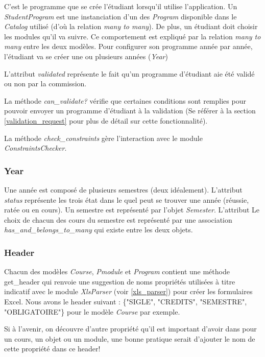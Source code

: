 C'est le programme que se crée l'étudiant lorsqu'il utilise l'application. Un \textit{StudentProgram} est une instanciation d'un des \textit{Program} disponible dans le \textit{Catalog} utilisé (d'où la relation \textit{many to many}). De plus, un étudiant doit choisir les modules qu'il va suivre. Ce comportement est expliqué par la relation \textit{many to many} entre les deux modèles. Pour configurer son programme année par année, l'étudiant va se créer une ou plusieurs années (\textit{Year})

L'attribut \textit{validated} représente le fait qu'un programme d'étudiant aie été validé ou non par la commission.

La méthode \textit{can\_validate?} vérifie que certaines conditions sont remplies pour pouvoir envoyer un programme d'étudiant à la validation (Se référer à la section \ref{validation_request} pour plus de détail sur cette fonctionnalité).

La méthode \textit{check\_constraints} gère l’interaction avec le module \textit{ConstraintsChecker}. 

\subsubsection{Year}

Une année est composé de plusieurs semestres (deux idéalement). L'attribut \textit{status} représente les trois état dans le quel peut se trouver une année (réussie, ratée ou en cours). Un semestre est représenté par l'objet \textit{Semester}. L'attribut Le choix de chacun des cours du semestre est représenté par une association \textit{has\_and\_belongs\_to\_many} qui existe entre les deux objets.

\subsubsection{Header}

Chacun des modèles \textit{Course}, \textit{Pmodule} et \textit{Program} contient une méthode get\_header qui renvoie une suggestion de noms propriétés utilisées à titre indicatif avec le module \textit{XlsParser} (voir \ref{xls_parser}) pour créer les formulaires Excel. Nous avons le header suivant : \{"SIGLE", "CREDITS", "SEMESTRE", "OBLIGATOIRE"\} pour le modèle \textit{Course} par exemple.

Si à l'avenir, on découvre d'autre propriété qu'il est important d'avoir dans pour un cours, un objet ou un module, une bonne pratique serait d'ajouter le nom de cette propriété dans ce header!

